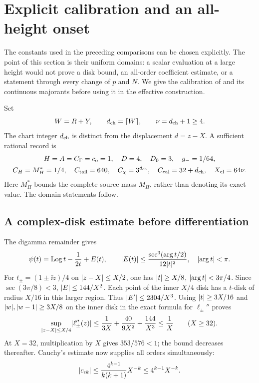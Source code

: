 \section{Explicit calibration and an all-height onset}
\label{sec:calibration}
The constants used in the preceding comparisons can be chosen
explicitly. The point of this section is their uniform domains:
a scalar evaluation at a large height would not prove a disk bound,
an all-order coefficient estimate, or a statement through every change
of \(p\) and \(N\). We give the calibration of \cite{rec11} and its
continuous majorants before using it in the effective construction.

Set
\[
 W=R+Y,\qquad d_{\rm ch}=\lceil W\rceil,\qquad
 \nu=d_{\rm ch}+1\ge4.
\]
The chart integer \(d_{\rm ch}\) is distinct from the displacement
\(d=z-X\). A sufficient rational record is
\begin{equation}
\begin{gathered}
 H=A=C_\Gamma=c_{\mathrm o}=1,\quad D=4,\quad D_0=3,
 \quad g_-=1/64,\\
 C_H=M_H^*=1/4,\quad C_{\rm tail}=640,\quad
 C_\chi=3^{d_{\rm ch}},\quad C_{\rm cal}=32+d_{\rm ch},
 \quad X_{\rm cl}=64\nu.
\end{gathered}
\label{eq:explicit-calibration}
\end{equation}
Here \(M_H^*\) bounds the complete source mass \(M_H\), rather than
denoting its exact value. The domain statements follow.

\subsection{A complex-disk estimate before differentiation}
\label{subsec:disk-calibration}
The digamma remainder \cite[\S5.11(ii)]{dlmfgamma} gives
\begin{equation}
 \psi(t)=\operatorname{Log} t-\frac1{2t}+E(t),\qquad
 \lvert E(t)\rvert\le\frac{\sec^3(\arg t/2)}{12\lvert t\rvert^2},
 \quad\lvert \arg t\rvert<\pi.
 \label{eq:digamma-calibration}
\end{equation}
For \(t_\pm=(1\pm\ii z)/4\) on \(\lvert z-X\rvert\le X/2\),
one has \(\lvert t\rvert\ge X/8\), \(\lvert \arg t\rvert<3\pi/4\).
Since \(\sec(3\pi/8)<3\), \(\lvert E\rvert\le144/X^2\).
Each point of the inner \(X/4\) disk has a \(t\)-disk of radius
\(X/16\) in this larger region. Thus \(\lvert E'\rvert\le2304/X^3\).
Using \(\lvert t\rvert\ge3X/16\) and
\(\lvert w\rvert,\lvert w-1\rvert\ge3X/8\) on the inner disk in the exact
formula for \(\ell_\pm''\) proves
\begin{equation}
 \sup_{\lvert z-X\rvert\le X/4}\lvert \ell_\pm''(z)\rvert
 \le\frac1{3X}+\frac{40}{9X^2}+\frac{144}{X^3}
 \le\frac1X\qquad(X\ge32).
 \label{eq:explicit-disk}
\end{equation}
At \(X=32\), multiplication by \(X\) gives \(353/576<1\);
the bound decreases thereafter. Cauchy's estimate now supplies all
orders simultaneously:
\[
 \lvert c_{\epsilon k}\rvert\le
       \frac{4^{k-1}}{k(k+1)}X^{-k}\le4^{k-1}X^{-k}.
\]


